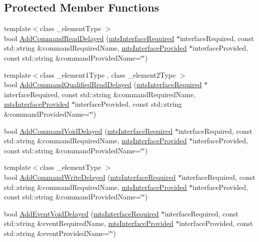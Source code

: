 \subsection*{Protected Member Functions}
\begin{DoxyCompactItemize}
\item 
{\footnotesize template$<$class \+\_\+element\+Type $>$ }\\bool \hyperlink{classmts_component_add_latency_ac6dee3c262dba3445e4ba73c5e1b9b4f}{Add\+Command\+Read\+Delayed} (\hyperlink{classmts_interface_required}{mts\+Interface\+Required} $\ast$interface\+Required, const std\+::string \&command\+Required\+Name, \hyperlink{classmts_interface_provided}{mts\+Interface\+Provided} $\ast$interface\+Provided, const std\+::string \&command\+Provided\+Name=\char`\"{}\char`\"{})
\item 
{\footnotesize template$<$class \+\_\+element1\+Type , class \+\_\+element2\+Type $>$ }\\bool \hyperlink{classmts_component_add_latency_acacec8748b88ec97306699676c5afdf9}{Add\+Command\+Qualified\+Read\+Delayed} (\hyperlink{classmts_interface_required}{mts\+Interface\+Required} $\ast$interface\+Required, const std\+::string \&command\+Required\+Name, \hyperlink{classmts_interface_provided}{mts\+Interface\+Provided} $\ast$interface\+Provided, const std\+::string \&command\+Provided\+Name=\char`\"{}\char`\"{})
\item 
bool \hyperlink{classmts_component_add_latency_a07896e9c13691b24e03a4be8850eb73b}{Add\+Command\+Void\+Delayed} (\hyperlink{classmts_interface_required}{mts\+Interface\+Required} $\ast$interface\+Required, const std\+::string \&command\+Required\+Name, \hyperlink{classmts_interface_provided}{mts\+Interface\+Provided} $\ast$interface\+Provided, const std\+::string \&command\+Provided\+Name=\char`\"{}\char`\"{})
\item 
{\footnotesize template$<$class \+\_\+element\+Type $>$ }\\bool \hyperlink{classmts_component_add_latency_aa9ab4ddcf79bcb8497f9af24a3af99c7}{Add\+Command\+Write\+Delayed} (\hyperlink{classmts_interface_required}{mts\+Interface\+Required} $\ast$interface\+Required, const std\+::string \&command\+Required\+Name, \hyperlink{classmts_interface_provided}{mts\+Interface\+Provided} $\ast$interface\+Provided, const std\+::string \&command\+Provided\+Name=\char`\"{}\char`\"{})
\item 
bool \hyperlink{classmts_component_add_latency_aeee9bc6dc807fb6cb6b3354ddc2883d2}{Add\+Event\+Void\+Delayed} (\hyperlink{classmts_interface_required}{mts\+Interface\+Required} $\ast$interface\+Required, const std\+::string \&event\+Required\+Name, \hyperlink{classmts_interface_provided}{mts\+Interface\+Provided} $\ast$interface\+Provided, const std\+::string \&event\+Provided\+Name=\char`\"{}\char`\"{})

\end{DoxyCompactItemize}
